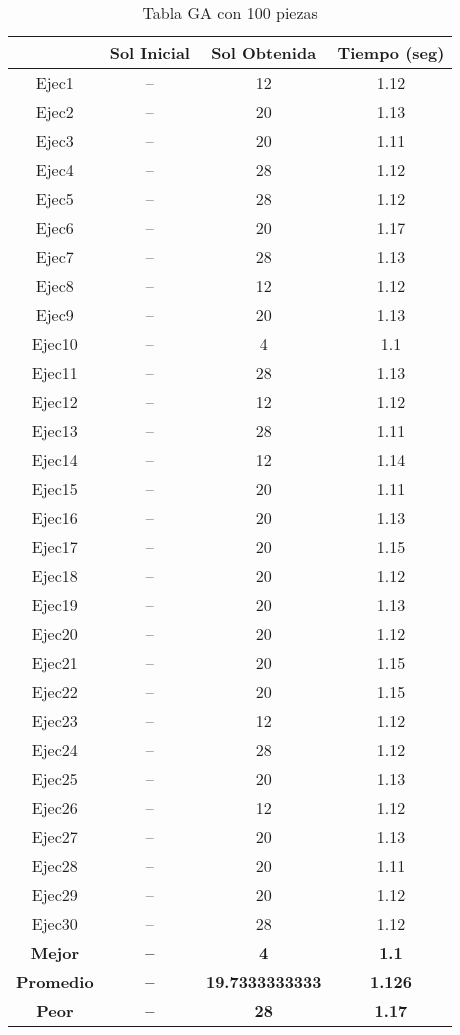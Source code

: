 
\begin{table}
\caption{Tabla GA con 100 piezas}
\centering
\begin{tabular}{|c|c|c|c|}
\hline
 & {\bf Sol Inicial} & {\bf Sol Obtenida} & {\bf Tiempo (seg)} \\
\hline
Ejec1 & -- & 12  & 1.12 \\
\hline
Ejec2 & -- & 20  & 1.13 \\
\hline
Ejec3 & -- & 20  & 1.11 \\
\hline
Ejec4 & -- & 28  & 1.12 \\
\hline
Ejec5 & -- & 28  & 1.12 \\
\hline
Ejec6 & -- & 20  & 1.17 \\
\hline
Ejec7 & -- & 28  & 1.13 \\
\hline
Ejec8 & -- & 12  & 1.12 \\
\hline
Ejec9 & -- & 20  & 1.13 \\
\hline
Ejec10 & -- & 4  & 1.1 \\
\hline
Ejec11 & -- & 28  & 1.13 \\
\hline
Ejec12 & -- & 12  & 1.12 \\
\hline
Ejec13 & -- & 28  & 1.11 \\
\hline
Ejec14 & -- & 12  & 1.14 \\
\hline
Ejec15 & -- & 20  & 1.11 \\
\hline
Ejec16 & -- & 20  & 1.13 \\
\hline
Ejec17 & -- & 20  & 1.15 \\
\hline
Ejec18 & -- & 20  & 1.12 \\
\hline
Ejec19 & -- & 20  & 1.13 \\
\hline
Ejec20 & -- & 20  & 1.12 \\
\hline
Ejec21 & -- & 20  & 1.15 \\
\hline
Ejec22 & -- & 20  & 1.15 \\
\hline
Ejec23 & -- & 12  & 1.12 \\
\hline
Ejec24 & -- & 28  & 1.12 \\
\hline
Ejec25 & -- & 20  & 1.13 \\
\hline
Ejec26 & -- & 12  & 1.12 \\
\hline
Ejec27 & -- & 20  & 1.13 \\
\hline
Ejec28 & -- & 20  & 1.11 \\
\hline
Ejec29 & -- & 20  & 1.12 \\
\hline
Ejec30 & -- & 28  & 1.12 \\
\hline
{\bf Mejor} & {\bf -- } & {\bf 4} & {\bf 1.1} \\
\hline
{\bf Promedio} & {\bf -- } & {\bf 19.7333333333} & {\bf 1.126} \\
\hline
{\bf Peor} & {\bf -- } & {\bf 28} & {\bf 1.17} \\
\hline
\end{tabular}
\end{table}

